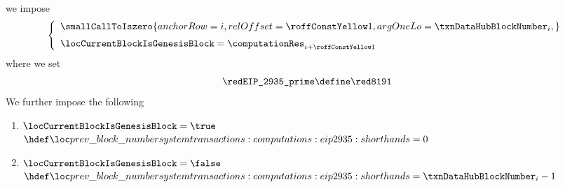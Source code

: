 \item[\underline{\underline{Defining the ``previous block number'':}}]
	we impose
	\[
		\left\{ \begin{array}{l}
			\smallCallToIszero {
				anchorRow = i                                       ,
				relOffset = \previousBlockNumberDefinitionRowOffset ,
				argOneLo  = \txnDataHubBlockNumber _{i}             ,
			}
			\vspace{2mm} \\
			\locCurrentBlockIsGenesisBlock
			=
			\computationRes _{i + \previousBlockNumberDefinitionRowOffset} \\
		\end{array} \right.
	\]
	where we set
	\[
		\locBlockHashPrimeModulus \define \locBlockHashPrimeModulusValue
	\]
	We further impose the following
	\begin{enumerate}
	        \item \If $\locCurrentBlockIsGenesisBlock = \true$  \Then $\locPreviousBlockNumber = 0$
	        \item \If $\locCurrentBlockIsGenesisBlock = \false$ \Then $\locPreviousBlockNumber = \txnDataHubBlockNumber _{i} - 1$
	\end{enumerate}
